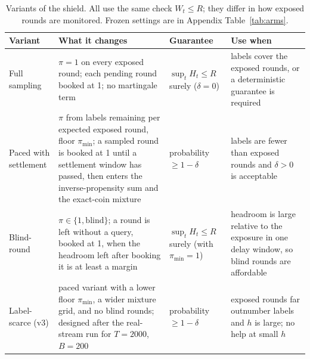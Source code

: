 \documentclass[10pt]{article}
\theoremstyle{plain}
\theoremstyle{definition}
\begin{document}
\begin{table}[t]
\caption{Variants of the shield. All use the same check $W_t\le R$; they differ in how exposed rounds are monitored. Frozen settings are in Appendix Table~\ref{tab:arms}.}\label{tab:variants}
\centering\small
\begin{tabular}{@{}p{2.5cm} p{5.3cm} p{2.6cm} p{3.9cm}@{}}
\toprule
Variant & What it changes & Guarantee & Use when \\
\midrule
Full sampling & $\pi=1$ on every exposed round; each pending round booked at 1; no martingale term & $\sup_tH_t\le R$ surely ($\delta=0$) & labels cover the exposed rounds, or a deterministic guarantee is required \\
Paced with settlement & $\pi$ from labels remaining per expected exposed round, floor $\pi_{\min}$; a sampled round is booked at 1 until a settlement window has passed, then enters the inverse-propensity sum and the exact-coin mixture & probability $\ge1-\delta$ & labels are fewer than exposed rounds and $\delta>0$ is acceptable \\
Blind-round & $\pi\in\{1,\text{blind}\}$; a round is left without a query, booked at 1, when the headroom left after booking it is at least a margin & $\sup_tH_t\le R$ surely (with $\pi_{\min}=1$) & headroom is large relative to the exposure in one delay window, so blind rounds are affordable \\
Label-scarce (v3) & paced variant with a lower floor $\pi_{\min}$, a wider mixture grid, and no blind rounds; designed after the real-stream run for $T=2000$, $B=200$ & probability $\ge1-\delta$ & exposed rounds far outnumber labels and $h$ is large; no help at small $h$ \\
\bottomrule
\end{tabular}
\end{table}
\end{document}
